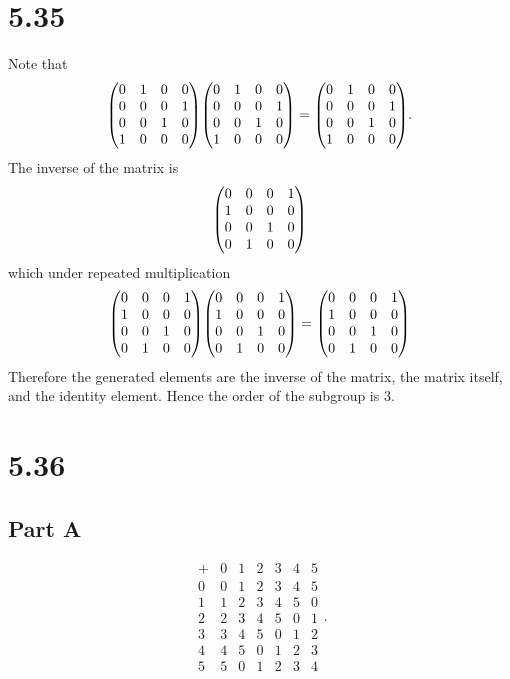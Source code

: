 \documentclass[12pt]{extarticle}
\begin{document}
\section*{5.35}
Note that
\[
	\mqty(
		0 & 1 & 0 & 0 \\
		0 & 0 & 0 & 1 \\
		0 & 0 & 1 & 0 \\
		1 & 0 & 0 & 0 \\
	)
	\mqty(
		0 & 1 & 0 & 0 \\
		0 & 0 & 0 & 1 \\
		0 & 0 & 1 & 0 \\
		1 & 0 & 0 & 0 \\
	) =
	\mqty(
		0 & 1 & 0 & 0 \\
		0 & 0 & 0 & 1 \\
		0 & 0 & 1 & 0 \\
		1 & 0 & 0 & 0 \\
	)
.\]
The inverse of the matrix is
\[
	\mqty(
		0 & 0 & 0 & 1 \\
		1 & 0 & 0 & 0 \\
		0 & 0 & 1 & 0 \\
		0 & 1 & 0 & 0 \\
	)
\]
which under repeated multiplication
\[
	\mqty(
		0 & 0 & 0 & 1 \\
		1 & 0 & 0 & 0 \\
		0 & 0 & 1 & 0 \\
		0 & 1 & 0 & 0 \\
	)
	\mqty(
		0 & 0 & 0 & 1 \\
		1 & 0 & 0 & 0 \\
		0 & 0 & 1 & 0 \\
		0 & 1 & 0 & 0 \\
	) =
	\mqty(
		0 & 0 & 0 & 1 \\
		1 & 0 & 0 & 0 \\
		0 & 0 & 1 & 0 \\
		0 & 1 & 0 & 0 \\
	)
\]
Therefore the generated elements are the inverse of the matrix, the matrix itself, and the identity element. Hence the order of the subgroup is $3$.

\section*{5.36}
\subsection*{Part A}
\[
	\begin{array}{c|c|c|c|c|c|c}
		+ & 0 & 1 & 2 & 3 & 4 & 5 \\\hline
		0 & 0 & 1 & 2 & 3 & 4 & 5 \\\hline
		1 & 1 & 2 & 3 & 4 & 5 & 0 \\\hline
		2 & 2 & 3 & 4 & 5 & 0 & 1 \\\hline
		3 & 3 & 4 & 5 & 0 & 1 & 2 \\\hline
		4 & 4 & 5 & 0 & 1 & 2 & 3 \\\hline
		5 & 5 & 0 & 1 & 2 & 3 & 4
	\end{array}
.\]
\end{document}
